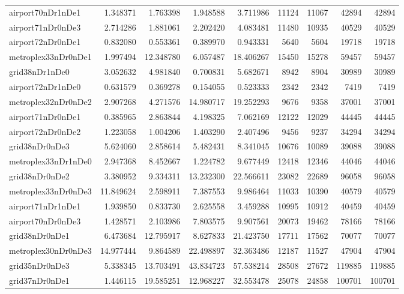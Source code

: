 \begin{longtable}{|l|r|r|r|r|r|r|r|r|}
airport70nDr1nDe1 & 1.348371 & 1.763398 & 1.948588 & 3.711986 & 11124 & 11067 & 42894 & 42894 \\
airport71nDr0nDe3 & 2.714286 & 1.881061 & 2.202420 & 4.083481 & 11480 & 10935 & 40529 & 40529 \\
airport72nDr0nDe1 & 0.832080 & 0.553361 & 0.389970 & 0.943331 & 5640 & 5604 & 19718 & 19718 \\
metroplex33nDr0nDe1 & 1.997494 & 12.348780 & 6.057487 & 18.406267 & 15450 & 15278 & 59457 & 59457 \\
grid38nDr1nDe0 & 3.052632 & 4.981840 & 0.700831 & 5.682671 & 8942 & 8904 & 30989 & 30989 \\
airport72nDr1nDe0 & 0.631579 & 0.369278 & 0.154055 & 0.523333 & 2342 & 2342 & 7419 & 7419 \\
metroplex32nDr0nDe2 & 2.907268 & 4.271576 & 14.980717 & 19.252293 & 9676 & 9358 & 37001 & 37001 \\
airport71nDr0nDe1 & 0.385965 & 2.863844 & 4.198325 & 7.062169 & 12122 & 12029 & 44445 & 44445 \\
airport72nDr0nDe2 & 1.223058 & 1.004206 & 1.403290 & 2.407496 & 9456 & 9237 & 34294 & 34294 \\
grid38nDr0nDe3 & 5.624060 & 2.858614 & 5.482431 & 8.341045 & 10676 & 10089 & 39088 & 39088 \\
metroplex33nDr1nDe0 & 2.947368 & 8.452667 & 1.224782 & 9.677449 & 12418 & 12346 & 44046 & 44046 \\
grid38nDr0nDe2 & 3.380952 & 9.334311 & 13.232300 & 22.566611 & 23082 & 22689 & 96058 & 96058 \\
metroplex33nDr0nDe3 & 11.849624 & 2.598911 & 7.387553 & 9.986464 & 11033 & 10390 & 40579 & 40579 \\
airport71nDr1nDe1 & 1.939850 & 0.833730 & 2.625558 & 3.459288 & 10995 & 10912 & 40459 & 40459 \\
airport70nDr0nDe3 & 1.428571 & 2.103986 & 7.803575 & 9.907561 & 20073 & 19462 & 78166 & 78166 \\
grid38nDr0nDe1 & 6.473684 & 12.795917 & 8.627833 & 21.423750 & 17711 & 17562 & 70077 & 70077 \\
metroplex30nDr0nDe3 & 14.977444 & 9.864589 & 22.498897 & 32.363486 & 12187 & 11527 & 47904 & 47904 \\
grid35nDr0nDe3 & 5.338345 & 13.703491 & 43.834723 & 57.538214 & 28508 & 27672 & 119885 & 119885 \\
grid37nDr0nDe1 & 1.446115 & 19.585251 & 12.968227 & 32.553478 & 25078 & 24858 & 100701 & 100701 \\

\end{longtable}
